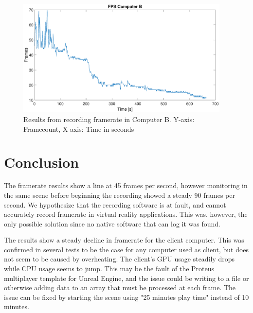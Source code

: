 \begin{figure}[H]
\centering
\includegraphics[width=0.95\textwidth]{InternalTest/B_fps.eps}
\caption{Results from recording framerate in Computer B. Y-axis: Framecount, X-axis: Time in seconds}
\end{figure}


\section*{Conclusion}
The framerate results show a line at 45 frames per second, however monitoring in the same scene before beginning the recording showed a steady 90 frames per second. We hypothesize that the recording software is at fault, and cannot accurately record framerate in virtual reality applications. This was, however, the only possible solution since no native software that can log it was found. 

The results show a steady decline in framerate for the client computer. This was confirmed in several tests to be the case for any computer used as client, but does not seem to be caused by overheating. The client's GPU usage steadily drops while CPU usage seems to jump. This may be the fault of the Proteus multiplayer template for Unreal Engine, and the issue could be writing to a file or otherwise adding data to an array that must be processed at each frame. The issue can be fixed by starting the scene using "25 minutes play time" instead of 10 minutes.
